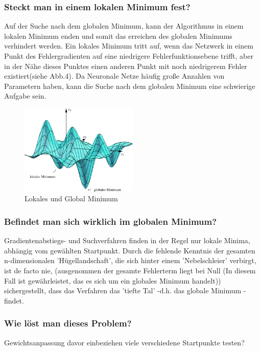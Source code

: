 \subsubsection{Steckt man in einem lokalen Minimum fest?}\label{subsec:gradientenverfahren:fehlerquellen_lokalen_minimum}
  Auf der Suche nach dem globalen Minimum, kann der Algorithmus in einem lokalen Minimum enden und somit das erreichen des globalen Minimums verhindert werden.
  Ein lokales Minimum tritt auf, wenn das Netzwerk in einem Punkt des Fehlergradienten auf eine niedrigere Fehlerfunktionsebene trifft, aber in der Nähe dieses Punktes einen anderen Punkt mit noch niedrigerem Fehler existiert(siehe Abb.4).
  Da Neuronale Netze häufig große Anzahlen von Parametern haben, kann die Suche nach dem globalen Minimum eine schwierige Aufgabe sein\cite{HS97}.
  \\
  \begin{figure}[ht]
    \centering
    \includegraphics[width=0.5\textwidth]{Sources/03-3.3.2_3-dimensionaler_abstieg.png}
    \caption{Lokales und Global Minimum}
    \label{subsec:lokale-globale-minima}
\end{figure}

\subsubsection{Befindet man sich wirklich im globalen Minimum?}\label{subsec:gradientenverfahren:fehlerquellen_globalen_minimum}
  Gradientenabstiegs- und Suchverfahren finden in der Regel nur lokale Minima, abhängig vom gewählten Startpunkt. Durch die fehlende Kenntnis der gesamten n-dimensionalen 'Hügellandschaft', die sich hinter 
  einem 'Nebelschleier' verbirgt, ist de facto nie, (ausgenommen der gesamte Fehlerterm liegt bei Null (In diesem Fall ist gewährleistet, das es sich um ein globales Minimum handelt))
  sichergestellt, dass das Verfahren das 'tiefte Tal' -d.h. das globale Minimum - findet.

\subsubsection{Wie löst man dieses Problem?}\label{subsec:gradientenverfahren:fehlerquellen_problem_loesen}
  Gewichtsanpassung davor einbeziehen
  viele verschiedene Startpunkte testen?


